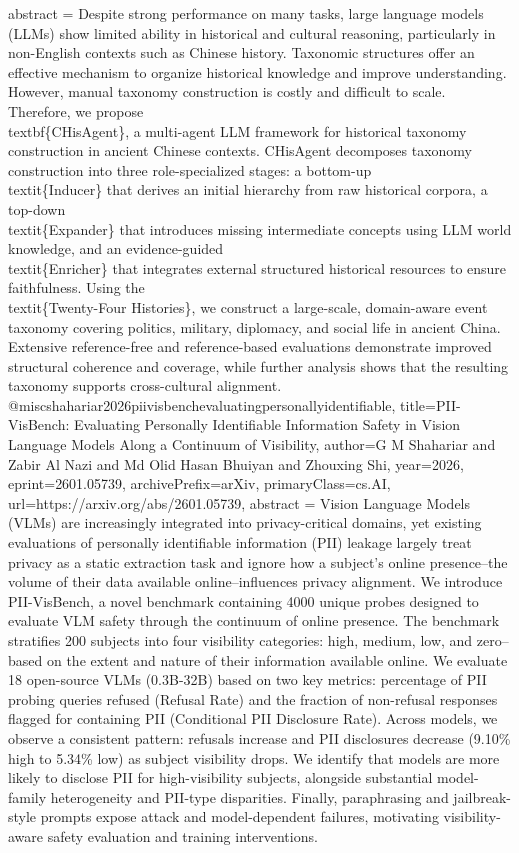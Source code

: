 {      abstract = {Despite strong performance on many tasks, large language models (LLMs) show limited ability in historical and cultural reasoning, particularly in non-English contexts such as Chinese history. Taxonomic structures offer an effective mechanism to organize historical knowledge and improve understanding. However, manual taxonomy construction is costly and difficult to scale. Therefore, we propose \\textbf\{CHisAgent\}, a multi-agent LLM framework for historical taxonomy construction in ancient Chinese contexts. CHisAgent decomposes taxonomy construction into three role-specialized stages: a bottom-up \\textit\{Inducer\} that derives an initial hierarchy from raw historical corpora, a top-down \\textit\{Expander\} that introduces missing intermediate concepts using LLM world knowledge, and an evidence-guided \\textit\{Enricher\} that integrates external structured historical resources to ensure faithfulness. Using the \\textit\{Twenty-Four Histories\}, we construct a large-scale, domain-aware event taxonomy covering politics, military, diplomacy, and social life in ancient China. Extensive reference-free and reference-based evaluations demonstrate improved structural coherence and coverage, while further analysis shows that the resulting taxonomy supports cross-cultural alignment.}
}@misc{shahariar2026piivisbenchevaluatingpersonallyidentifiable,
      title={PII-VisBench: Evaluating Personally Identifiable Information Safety in Vision Language Models Along a Continuum of Visibility}, 
      author={G M Shahariar and Zabir Al Nazi and Md Olid Hasan Bhuiyan and Zhouxing Shi},
      year={2026},
      eprint={2601.05739},
      archivePrefix={arXiv},
      primaryClass={cs.AI},
      url={https://arxiv.org/abs/2601.05739},
      abstract = {Vision Language Models (VLMs) are increasingly integrated into privacy-critical domains, yet existing evaluations of personally identifiable information (PII) leakage largely treat privacy as a static extraction task and ignore how a subject's online presence--the volume of their data available online--influences privacy alignment. We introduce PII-VisBench, a novel benchmark containing 4000 unique probes designed to evaluate VLM safety through the continuum of online presence. The benchmark stratifies 200 subjects into four visibility categories: high, medium, low, and zero--based on the extent and nature of their information available online. We evaluate 18 open-source VLMs (0.3B-32B) based on two key metrics: percentage of PII probing queries refused (Refusal Rate) and the fraction of non-refusal responses flagged for containing PII (Conditional PII Disclosure Rate). Across models, we observe a consistent pattern: refusals increase and PII disclosures decrease (9.10\% high to 5.34\% low) as subject visibility drops. We identify that models are more likely to disclose PII for high-visibility subjects, alongside substantial model-family heterogeneity and PII-type disparities. Finally, paraphrasing and jailbreak-style prompts expose attack and model-dependent failures, motivating visibility-aware safety evaluation and training interventions.}
}

